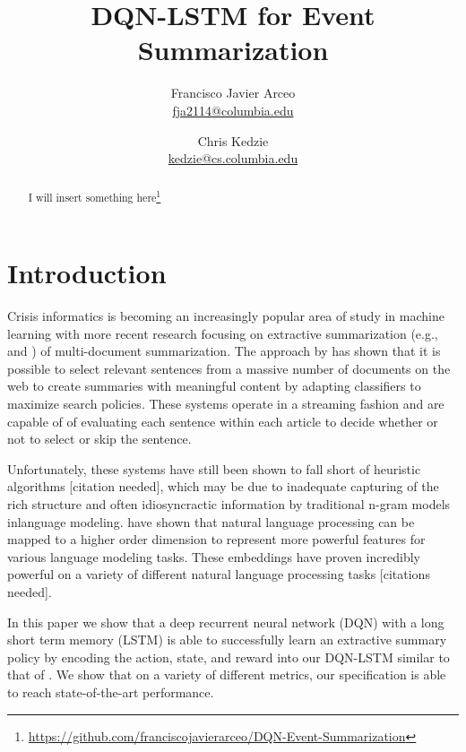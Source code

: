 \documentclass[12pt]{article}
\title{DQN-LSTM for Event Summarization }
\author{
	Francisco Javier Arceo \\ \href{mailto: fja2114@columbia.edu}{\small fja2114@columbia.edu} 
		\and  
	Chris Kedzie \\ \href{mailto: kedzie@cs.columbia.edu}{\small kedzie@cs.columbia.edu} 
	}
\begin{document}
\maketitle

\begin{abstract}
I will insert something here\footnote{ \url{https://github.com/franciscojavierarceo/DQN-Event-Summarization} }
\end{abstract}




\section{Introduction}

Crisis informatics is becoming an increasingly popular area of study in machine learning with more recent research focusing on extractive summarization (e.g., \cite{kedzie2015predicting} and \cite{kedzieextractive}) of multi-document summarization. The approach by \cite{kedzie2015predicting}  has shown that it is possible to select relevant sentences from a massive number of documents on the web to create summaries with meaningful content by adapting classifiers to maximize search policies. These systems operate in a streaming fashion and are capable of of evaluating each sentence within each article to decide whether or not to select or skip the sentence. 

Unfortunately, these systems have still been shown to fall short of heuristic algorithms [citation needed], which may be due to inadequate capturing of the rich structure and often idiosyncractic information by traditional n-gram models  inlanguage modeling. \cite{bengio2003neural} have shown that natural language processing can be mapped to a higher order dimension to represent more powerful features for various language modeling tasks. These embeddings have proven incredibly powerful on a variety of different natural language processing tasks [citations needed].

In this paper we show that a deep recurrent neural network (DQN) with a long short term memory (LSTM) is able to successfully learn an extractive summary policy by encoding the action, state, and reward into our DQN-LSTM similar to that of  \cite{hausknecht2015deep}. We show that on a variety of different metrics, our specification is able to reach state-of-the-art performance.
\end{document}

